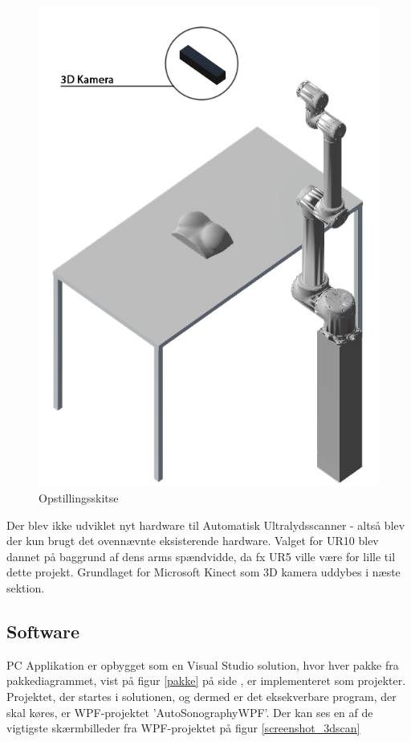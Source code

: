 \begin{figure}[H]
\begin{minipage}{0.4\textwidth}
    \includegraphics[width=\textwidth]{figurer/3d_setup}
    \caption{Opstillingsskitse}
    \label{3dsetup}
  \end{minipage}
\end{figure}

Der blev ikke udviklet nyt hardware til Automatisk Ultralydsscanner - altså blev der kun brugt det ovennævnte eksisterende hardware. Valget for UR10 blev dannet på baggrund af dens arms spændvidde, da fx UR5 ville være for lille til dette projekt. Grundlaget for Microsoft Kinect som 3D kamera uddybes i næste sektion.

\subsection{Software}
PC Applikation er opbygget som en Visual Studio solution, hvor hver pakke fra pakkediagrammet, vist på figur \ref{pakke} på side \pageref{pakke}, er implementeret som projekter. Projektet, der startes i solutionen, og dermed er det eksekverbare program, der skal køres, er WPF-projektet 'AutoSonographyWPF'. Der kan ses en af de vigtigste skærmbilleder fra WPF-projektet på figur \ref{screenshot_3dscan} \newline

